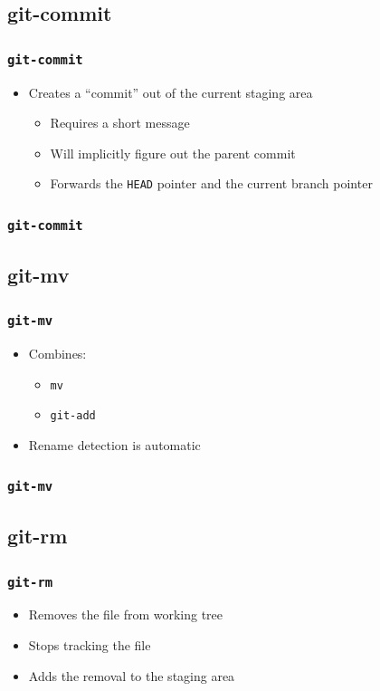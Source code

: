\documentclass{beamer}
\begin{document}
\subsection{git-commit}
\begin{frame}
\frametitle{\texttt{git-commit}}
\begin{itemize}
\item{Creates a ``commit'' out of the current staging area}
\begin{itemize}
\item{Requires a short message}
\item{Will implicitly figure out the parent commit}
\item{Forwards the \texttt{HEAD} pointer and the current branch pointer}
\end{itemize}
\end{itemize}
\end{frame}

\begin{frame}[fragile]
\frametitle{\texttt{git-commit}}

\end{frame}

\subsection{git-mv}
\begin{frame}
\frametitle{\texttt{git-mv}}
\begin{itemize}
\item{Combines:}
\begin{itemize}
\item{\texttt{mv}}
\item{\texttt{git-add}}
\end{itemize}
\item{Rename detection is automatic}
\end{itemize}
\end{frame}

\begin{frame}
\frametitle{\texttt{git-mv}}

\end{frame}

\subsection{git-rm}
\begin{frame}
\frametitle{\texttt{git-rm}}
\begin{itemize}
\item{Removes the file from working tree}
\item{Stops tracking the file}
\item{Adds the removal to the staging area}
\end{itemize}
\end{frame}
\end{document}
